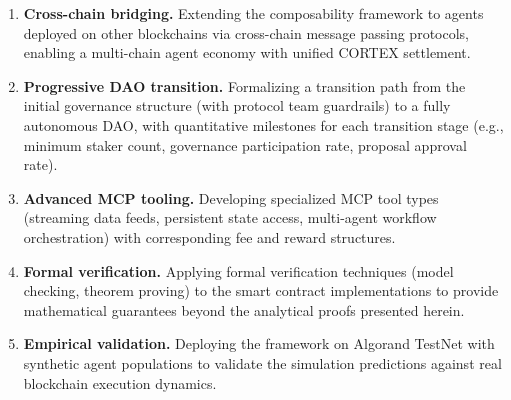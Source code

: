 \begin{enumerate}
  \item \textbf{Cross-chain bridging.} Extending the composability framework
    to agents deployed on other blockchains via cross-chain message passing
    protocols, enabling a multi-chain agent economy with unified CORTEX
    settlement.

  \item \textbf{Progressive DAO transition.} Formalizing a transition path
    from the initial governance structure (with protocol team guardrails) to a
    fully autonomous DAO, with quantitative milestones for each transition
    stage (e.g., minimum staker count, governance participation rate,
    proposal approval rate).

  \item \textbf{Advanced MCP tooling.} Developing specialized MCP tool types
    (streaming data feeds, persistent state access, multi-agent workflow
    orchestration) with corresponding fee and reward structures.

  \item \textbf{Formal verification.} Applying formal verification techniques
    (model checking, theorem proving) to the smart contract implementations to
    provide mathematical guarantees beyond the analytical proofs presented
    herein.

  \item \textbf{Empirical validation.} Deploying the framework on Algorand
    TestNet with synthetic agent populations to validate the simulation
    predictions against real blockchain execution dynamics.
\end{enumerate}
